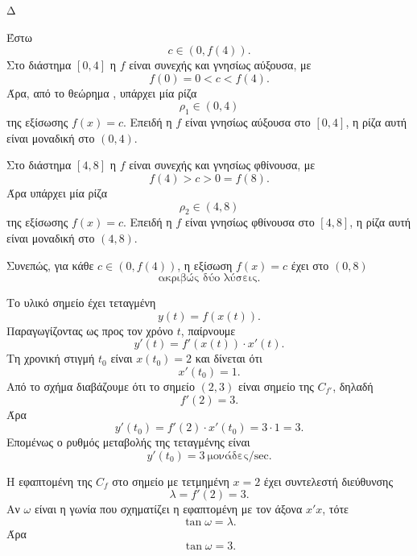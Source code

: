 \begin{thema}{Δ}
\begin{erwthma}
\item Έστω
\[
c\in(0,f(4)).
\]
Στο διάστημα $[0,4]$ η $f$ είναι συνεχής και γνησίως αύξουσα, με
\[
f(0)=0<c<f(4).
\]
Άρα, από το θεώρημα , υπάρχει μία ρίζα
\[
\rho_1\in(0,4)
\]
της εξίσωσης $f(x)=c$. Επειδή η $f$ είναι γνησίως αύξουσα στο $[0,4]$,
η ρίζα αυτή είναι μοναδική στο $(0,4)$.

Στο διάστημα $[4,8]$ η $f$ είναι συνεχής και γνησίως φθίνουσα, με
\[
f(4)>c>0=f(8).
\]
Άρα υπάρχει μία ρίζα
\[
\rho_2\in(4,8)
\]
της εξίσωσης $f(x)=c$. Επειδή η $f$ είναι γνησίως φθίνουσα στο $[4,8]$,
η ρίζα αυτή είναι μοναδική στο $(4,8)$.

Συνεπώς, για κάθε $c\in(0,f(4))$, η εξίσωση $f(x)=c$ έχει στο $(0,8)$
\[
{\text{ακριβώς δύο λύσεις}}.
\]

\item Το υλικό σημείο έχει τεταγμένη
\[
y(t)=f(x(t)).
\]
Παραγωγίζοντας ως προς τον χρόνο $t$, παίρνουμε
\[
y'(t)=f'(x(t))\cdot x'(t).
\]
Τη χρονική στιγμή $t_0$ είναι $x(t_0)=2$ και δίνεται ότι
\[
x'(t_0)=1.
\]
Από το σχήμα διαβάζουμε ότι το σημείο $(2,3)$ είναι σημείο της $C_{f'}$,
δηλαδή
\[
f'(2)=3.
\]
Άρα
\[
y'(t_0)=f'(2)\cdot x'(t_0)=3\cdot1=3.
\]
Επομένως ο ρυθμός μεταβολής της τεταγμένης είναι
\[
{y'(t_0)=3\ \text{μονάδες/sec}}.
\]

Η εφαπτομένη της $C_f$ στο σημείο με τετμημένη $x=2$ έχει συντελεστή
διεύθυνσης
\[
\lambda=f'(2)=3.
\]
Αν $\omega$ είναι η γωνία που σχηματίζει η εφαπτομένη με τον άξονα
$x'x$, τότε
\[
\tan\omega=\lambda.
\]
Άρα
\[
{\tan\omega=3}.
\]
\end{erwthma}
\end{thema}

